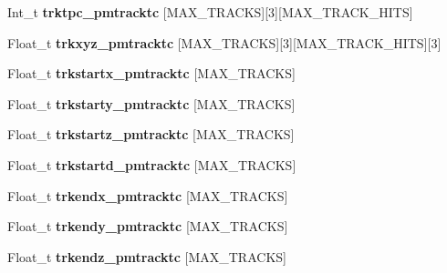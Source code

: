 \begin{DoxyCompactItemize}
\item 
\hypertarget{classanatree_a4f72a32de56ea4acabed5f7af36de5fb}{Int\-\_\-t {\bfseries trktpc\-\_\-pmtracktc} \mbox{[}M\-A\-X\-\_\-\-T\-R\-A\-C\-K\-S\mbox{]}\mbox{[}3\mbox{]}\mbox{[}M\-A\-X\-\_\-\-T\-R\-A\-C\-K\-\_\-\-H\-I\-T\-S\mbox{]}}\label{classanatree_a4f72a32de56ea4acabed5f7af36de5fb}

\item 
\hypertarget{classanatree_ab16b7f14f5e6fca149d74f529415da6a}{Float\-\_\-t {\bfseries trkxyz\-\_\-pmtracktc} \mbox{[}M\-A\-X\-\_\-\-T\-R\-A\-C\-K\-S\mbox{]}\mbox{[}3\mbox{]}\mbox{[}M\-A\-X\-\_\-\-T\-R\-A\-C\-K\-\_\-\-H\-I\-T\-S\mbox{]}\mbox{[}3\mbox{]}}\label{classanatree_ab16b7f14f5e6fca149d74f529415da6a}

\item 
\hypertarget{classanatree_aee4d66a2840c225fdf8f5e2852959cff}{Float\-\_\-t {\bfseries trkstartx\-\_\-pmtracktc} \mbox{[}M\-A\-X\-\_\-\-T\-R\-A\-C\-K\-S\mbox{]}}\label{classanatree_aee4d66a2840c225fdf8f5e2852959cff}

\item 
\hypertarget{classanatree_aa1fbfa3b3483659eea7d6c5c814e682b}{Float\-\_\-t {\bfseries trkstarty\-\_\-pmtracktc} \mbox{[}M\-A\-X\-\_\-\-T\-R\-A\-C\-K\-S\mbox{]}}\label{classanatree_aa1fbfa3b3483659eea7d6c5c814e682b}

\item 
\hypertarget{classanatree_a17bbd9a79203f3eb455b3a71b0fed64a}{Float\-\_\-t {\bfseries trkstartz\-\_\-pmtracktc} \mbox{[}M\-A\-X\-\_\-\-T\-R\-A\-C\-K\-S\mbox{]}}\label{classanatree_a17bbd9a79203f3eb455b3a71b0fed64a}

\item 
\hypertarget{classanatree_ae9e94d52eeab80c5aef6a3e53e88ba46}{Float\-\_\-t {\bfseries trkstartd\-\_\-pmtracktc} \mbox{[}M\-A\-X\-\_\-\-T\-R\-A\-C\-K\-S\mbox{]}}\label{classanatree_ae9e94d52eeab80c5aef6a3e53e88ba46}

\item 
\hypertarget{classanatree_a1af511a02182ee259a0721daa054ad56}{Float\-\_\-t {\bfseries trkendx\-\_\-pmtracktc} \mbox{[}M\-A\-X\-\_\-\-T\-R\-A\-C\-K\-S\mbox{]}}\label{classanatree_a1af511a02182ee259a0721daa054ad56}

\item 
\hypertarget{classanatree_a0329b01453907face0bc6374ed6480fc}{Float\-\_\-t {\bfseries trkendy\-\_\-pmtracktc} \mbox{[}M\-A\-X\-\_\-\-T\-R\-A\-C\-K\-S\mbox{]}}\label{classanatree_a0329b01453907face0bc6374ed6480fc}

\item 
\hypertarget{classanatree_a59616b2a2011fe1f367235a0ad23e634}{Float\-\_\-t {\bfseries trkendz\-\_\-pmtracktc} \mbox{[}M\-A\-X\-\_\-\-T\-R\-A\-C\-K\-S\mbox{]}}\label{classanatree_a59616b2a2011fe1f367235a0ad23e634}


\end{DoxyCompactItemize}
